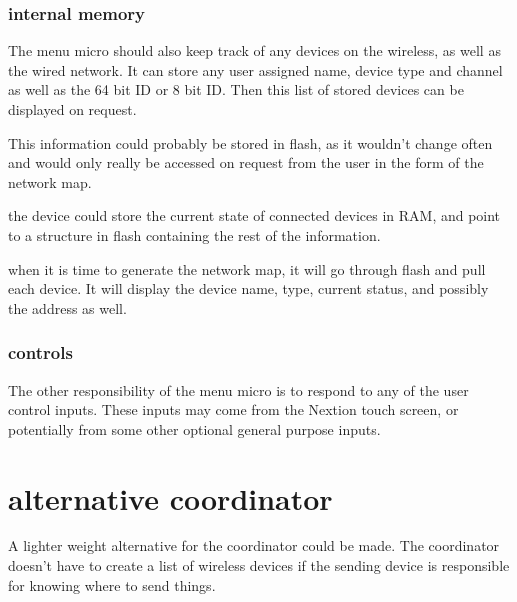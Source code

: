 \documentclass{article}
\begin{document}
     \subsubsection{internal memory}
     The menu micro should also keep track of any devices on the wireless, as well as the wired network.
     It can store any user assigned name, device type and channel as well as the 64 bit ID or 8 bit ID.
     Then this list of stored devices can be displayed on request.
     
     This information could probably be stored in flash, as it wouldn't change often and would only really be accessed on request from the user in the form of the network map.
     
     the device could store the current state of connected devices in RAM, and point to a structure in flash containing the rest of the information.
     
     when it is time to generate the network map, it will go through flash and pull each device.
     It will display the device name, type, current status, and possibly the address as well.
     
     
     \subsubsection{controls}
     The other responsibility of the menu micro is to respond to any of the user control inputs.
     These inputs may come from the Nextion touch screen, or potentially from some other optional general purpose inputs.
     
     \section{alternative coordinator}
     A lighter weight alternative for the coordinator could be made.
     The coordinator doesn't have to create a list of wireless devices if the sending device is responsible for
     knowing where to send things.
     
\end{document}
